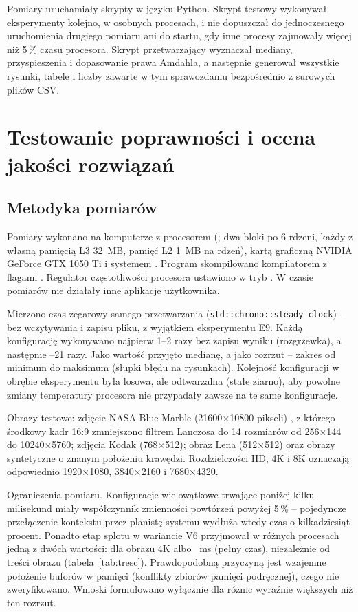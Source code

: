 \documentclass[12pt,a4paper]{article}
\newcommand{\kod}[1]{\texttt{#1}}
\begin{document}
Pomiary uruchamiały skrypty w języku Python. Skrypt testowy wykonywał eksperymenty kolejno, w osobnych procesach, i nie dopuszczał do jednoczesnego uruchomienia drugiego pomiaru ani do startu, gdy inne procesy zajmowały więcej niż 5\,\% czasu procesora. Skrypt przetwarzający wyznaczał mediany, przyspieszenia i dopasowanie prawa Amdahla, a następnie generował wszystkie rysunki, tabele i liczby zawarte w tym sprawozdaniu bezpośrednio z surowych plików CSV.

\section{Testowanie poprawności i ocena jakości rozwiązań}

\subsection{Metodyka pomiarów}

Pomiary wykonano  na komputerze z procesorem  (; dwa bloki po 6 rdzeni, każdy z własną pamięcią L3 32~MB, pamięć L2 1~MB na rdzeń), kartą graficzną NVIDIA GeForce GTX 1050 Ti i systemem . Program skompilowano kompilatorem  z flagami . Regulator częstotliwości procesora ustawiono w tryb . W czasie pomiarów nie działały inne aplikacje użytkownika.

Mierzono czas zegarowy samego przetwarzania (\kod{std::chrono::steady\_clock}) -- bez wczytywania i zapisu pliku, z wyjątkiem eksperymentu E9. Każdą konfigurację wykonywano najpierw 1--2 razy bez zapisu wyniku (rozgrzewka), a następnie --21 razy. Jako wartość przyjęto medianę, a jako rozrzut -- zakres od minimum do maksimum (słupki błędu na rysunkach). Kolejność konfiguracji w obrębie eksperymentu była losowa, ale odtwarzalna (stałe ziarno), aby powolne zmiany temperatury procesora nie przypadały zawsze na te same konfiguracje.

Obrazy testowe: zdjęcie NASA Blue Marble (21600$\times$10800 pikseli) \cite{nasa}, z którego środkowy kadr 16:9 zmniejszono filtrem Lanczosa do 14 rozmiarów od 256$\times$144 do 10240$\times$5760; zdjęcia Kodak \cite{kodak} (768$\times$512); obraz Lena (512$\times$512) oraz obrazy syntetyczne o znanym położeniu krawędzi. Rozdzielczości HD, 4K i 8K oznaczają odpowiednio 1920$\times$1080, 3840$\times$2160 i 7680$\times$4320.

Ograniczenia pomiaru. Konfiguracje wielowątkowe trwające poniżej kilku milisekund miały współczynnik zmienności powtórzeń powyżej 5\,\% -- pojedyncze przełączenie kontekstu przez planistę systemu wydłuża wtedy czas o kilkadziesiąt procent. Ponadto etap splotu w wariancie V6 przyjmował w różnych procesach jedną z dwóch wartości: dla obrazu 4K  albo ~ms (pełny czas), niezależnie od treści obrazu (tabela~\ref{tab:tresc}). Prawdopodobną przyczyną jest wzajemne położenie buforów w pamięci (konflikty zbiorów pamięci podręcznej), czego nie zweryfikowano. Wnioski formułowano wyłącznie dla różnic wyraźnie większych niż ten rozrzut.
\end{document}
